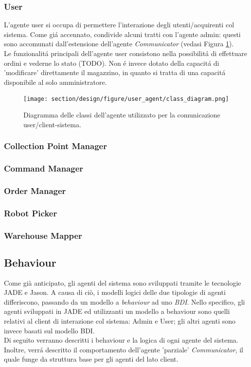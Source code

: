 \subsubsection{User}
L'agente user si occupa di permettere l'interazione degli utenti/acquirenti col sistema. Come gi\'a accennato, condivide alcuni tratti con l'agente admin: questi sono accomunati dall'estensione dell'agente \textit{Communicator} (vedasi Figura \ref{fig:class_diagram_user_agent}).\\
Le funzionalit\'a principali dell'agente user consistono nella possibilit\'a di effettuare ordini e vederne lo stato (TODO). Non \'e invece dotato della capacit\'a di 'modificare' direttamente il magazzino, in quanto si tratta di una capacit\'a disponibile al solo amministratore.
\begin{figure}[ht]
    \texttt{[image: section/design/figure/user\_agent/class\_diagram.png]}
    \caption{Diagramma delle classi dell'agente utilizzato per la comunicazione user/client-sistema.}
    \label{fig:class_diagram_user_agent}
\end{figure}

\subsubsection{Collection Point Manager}
\subsubsection{Command Manager}
\subsubsection{Order Manager}
\subsubsection{Robot Picker}
\subsubsection{Warehouse Mapper}

\subsection{Behaviour}


Come già anticipato, gli agenti del sistema sono sviluppati tramite le tecnologie JADE e Jason. A causa di ciò, i modelli logici delle due tipologie di agenti differiscono, passando da un modello a \textit{behaviour} ad uno \textit{BDI}. Nello specifico, gli agenti sviluppati in JADE ed utilizzanti un modello a behaviour sono quelli relativi al client di interazione col sistema: Admin e User; gli altri agenti sono invece basati sul modello BDI.\\
Di seguito verranno descritti i behaviour e la logica di ogni agente del sistema. Inoltre, verr\'a descritto il comportamento dell'agente 'parziale' \textit{Communicator}, il quale funge da struttura base per gli agenti del lato client.


